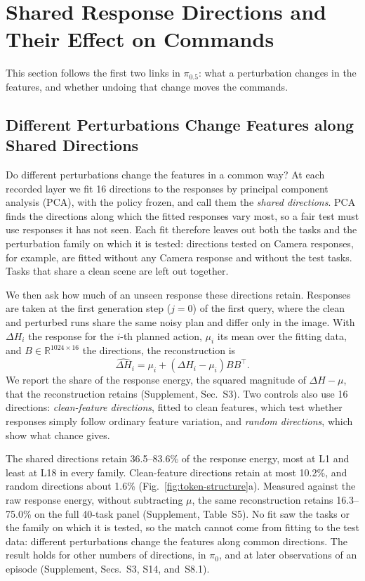 \section{Shared Response Directions and Their Effect on Commands}
\label{sec:structured}
This section follows the first two links in $\pi_{0.5}$: what a perturbation changes in the features, and whether undoing that change moves the commands.

\subsection{Different Perturbations Change Features along Shared Directions}
\label{sec:shared}
Do different perturbations change the features in a common way? At each recorded layer we fit 16 directions to the responses by principal component analysis (PCA), with the policy frozen, and call them the \emph{shared directions}. PCA finds the directions along which the fitted responses vary most, so a fair test must use responses it has not seen. Each fit therefore leaves out both the tasks and the perturbation family on which it is tested: directions tested on Camera responses, for example, are fitted without any Camera response and without the test tasks. Tasks that share a clean scene are left out together.

We then ask how much of an unseen response these directions retain. Responses are taken at the first generation step ($j=0$) of the first query, where the clean and perturbed runs share the same noisy plan and differ only in the image. With $\Delta H_i$ the response for the $i$-th planned action, $\mu_i$ its mean over the fitting data, and $B\in\mathbb R^{1024\times16}$ the directions, the reconstruction is
\begin{equation}
\widehat{\Delta H}_i=\mu_i+(\Delta H_i-\mu_i)BB^\top.
\label{eq:p08-reconstruction}
\end{equation}
We report the share of the response energy, the squared magnitude of $\Delta H-\mu$, that the reconstruction retains (Supplement, Sec.~S3). Two controls also use 16 directions: \emph{clean-feature directions}, fitted to clean features, which test whether responses simply follow ordinary feature variation, and \emph{random directions}, which show what chance gives.

The shared directions retain 36.5--83.6\% of the response energy, most at L1 and least at L18 in every family. Clean-feature directions retain at most 10.2\%, and random directions about 1.6\% (Fig.~\ref{fig:token-structure}a). Measured against the raw response energy, without subtracting $\mu$, the same reconstruction retains 16.3--75.0\% on the full 40-task panel (Supplement, Table~S5). No fit saw the tasks or the family on which it is tested, so the match cannot come from fitting to the test data: different perturbations change the features along common directions. The result holds for other numbers of directions, in $\pi_0$, and at later observations of an episode (Supplement, Secs.~S3, S14, and~S8.1).

